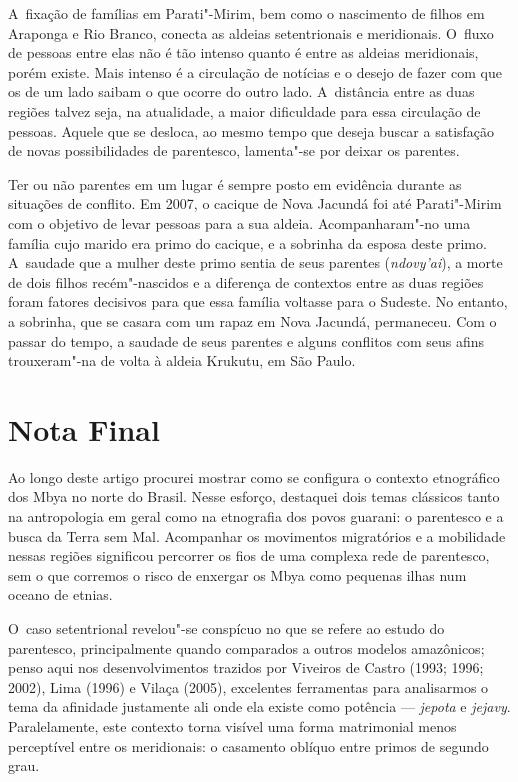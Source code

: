 A~fixação de famílias em Parati"-Mirim, bem como o nascimento de filhos
em Araponga e Rio Branco, conecta as aldeias setentrionais e
meridionais. O~fluxo de pessoas entre elas não é tão intenso quanto é
entre as aldeias meridionais, porém existe. Mais intenso é a circulação
de notícias e o desejo de fazer com que os de um lado saibam o que
ocorre do outro lado. A~distância entre as duas regiões talvez seja, na
atualidade, a maior dificuldade para essa circulação de pessoas. Aquele
que se desloca, ao mesmo tempo que deseja buscar a satisfação de novas
possibilidades de parentesco, lamenta"-se por deixar os parentes. 

Ter ou não parentes em um lugar é sempre posto em evidência durante as
situações de conflito. Em 2007, o cacique de Nova Jacundá foi até
Parati"-Mirim com o objetivo de levar pessoas para a sua aldeia.
Acompanharam"-no uma família cujo marido era primo do cacique, e a
sobrinha da esposa deste primo. A~saudade que a mulher deste primo
sentia de seus parentes (\emph{ndovy’ai}), a morte de dois filhos
recém"-nascidos e a diferença de contextos entre as duas regiões foram
fatores decisivos para que essa família voltasse para o Sudeste. No
entanto, a sobrinha, que se casara com um rapaz em Nova Jacundá,
permaneceu. Com o passar do tempo, a saudade de seus parentes e alguns
conflitos com seus afins trouxeram"-na de volta à aldeia Krukutu, em São
Paulo.

\section{Nota Final}

Ao longo deste artigo procurei mostrar como se configura o contexto
etnográfico dos Mbya no norte do Brasil. Nesse esforço, destaquei dois
temas clássicos tanto na antropologia em geral como na etnografia dos
povos guarani: o parentesco e a busca da Terra sem Mal. Acompanhar os
movimentos migratórios e a mobilidade nessas regiões significou
percorrer os fios de uma complexa rede de parentesco, sem o que
corremos o risco de enxergar os Mbya como pequenas ilhas num oceano de
etnias.

O~caso setentrional revelou"-se conspícuo no que se refere ao estudo do
parentesco, principalmente quando comparados a outros modelos
amazônicos; penso aqui nos desenvolvimentos trazidos por Viveiros de
Castro (1993; 1996; 2002), Lima (1996) e Vilaça (2005), excelentes
ferramentas para analisarmos o tema da afinidade justamente ali onde
ela existe como potência --- \emph{jepota} e \emph{jejavy}. Paralelamente, este
contexto torna visível uma forma matrimonial menos perceptível entre os
meridionais: o casamento oblíquo entre primos de segundo grau.

